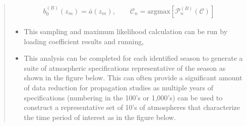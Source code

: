 \documentclass[letterpaper,10pt,english]{sphinxmanual}
\begin{document}
\begin{itemize}
\begin{quote}
\begin{itemize}
\end{itemize}
\begin{equation*}
\begin{split}b_0^{(B)} \left( z_m \right) = \bar{a}  \left( z_m \right) , \quad \quad \mathcal{C}_n = \text{argmax} \left[ \mathcal{P}_n^{(B)} \left( \mathcal{C} \right) \right]\end{split}
\end{equation*}\begin{itemize}
\item {} 
This sampling and maximum likelihood calculation can be run by loading coefficient results and running,

\end{itemize}

\begin{sphinxVerbatim}[commandchars=\\\{\}]
  
   
   
   

   
  
\end{sphinxVerbatim}
\begin{itemize}
\item {} 
This analysis can be completed for each identified season to generate a suite of atmospheric specifications representative of the season as shown in the figure below.  This can often provide a significant amount of data reduction for propagation studies as multiple years of specifications (numbering in the 100’s or 1,000’s) can be used to construct a representative set of 10’s of atmospheres that characterize the time period of interest as in the figure below.


\end{itemize}
\end{quote}
\end{itemize}
\end{document}
